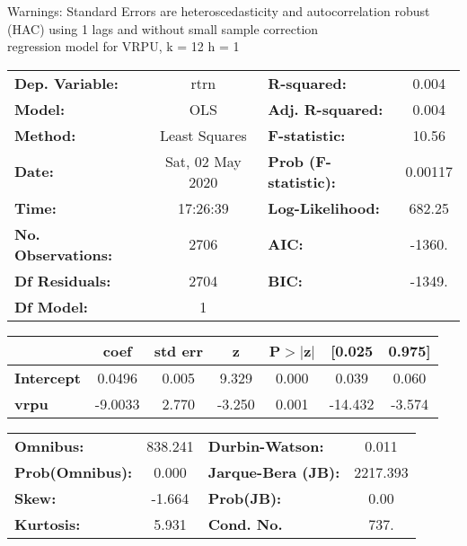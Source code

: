 Warnings: \newline
 [1] Standard Errors are heteroscedasticity and autocorrelation robust (HAC) using 1 lags and without small sample correction\\ 

regression model for VRPU, k = 12 h = 1\begin{center}
\begin{tabular}{lclc}
\toprule
\textbf{Dep. Variable:}    &       rtrn       & \textbf{  R-squared:         } &     0.004   \\
\textbf{Model:}            &       OLS        & \textbf{  Adj. R-squared:    } &     0.004   \\
\textbf{Method:}           &  Least Squares   & \textbf{  F-statistic:       } &     10.56   \\
\textbf{Date:}             & Sat, 02 May 2020 & \textbf{  Prob (F-statistic):} &  0.00117    \\
\textbf{Time:}             &     17:26:39     & \textbf{  Log-Likelihood:    } &    682.25   \\
\textbf{No. Observations:} &        2706      & \textbf{  AIC:               } &    -1360.   \\
\textbf{Df Residuals:}     &        2704      & \textbf{  BIC:               } &    -1349.   \\
\textbf{Df Model:}         &           1      & \textbf{                     } &             \\
\bottomrule
\end{tabular}
\begin{tabular}{lcccccc}
                   & \textbf{coef} & \textbf{std err} & \textbf{z} & \textbf{P$> |$z$|$} & \textbf{[0.025} & \textbf{0.975]}  \\
\midrule
\textbf{Intercept} &       0.0496  &        0.005     &     9.329  &         0.000        &        0.039    &        0.060     \\
\textbf{vrpu}      &      -9.0033  &        2.770     &    -3.250  &         0.001        &      -14.432    &       -3.574     \\
\bottomrule
\end{tabular}
\begin{tabular}{lclc}
\textbf{Omnibus:}       & 838.241 & \textbf{  Durbin-Watson:     } &    0.011  \\
\textbf{Prob(Omnibus):} &   0.000 & \textbf{  Jarque-Bera (JB):  } & 2217.393  \\
\textbf{Skew:}          &  -1.664 & \textbf{  Prob(JB):          } &     0.00  \\
\textbf{Kurtosis:}      &   5.931 & \textbf{  Cond. No.          } &     737.  \\
\bottomrule
\end{tabular}
\end{center}

